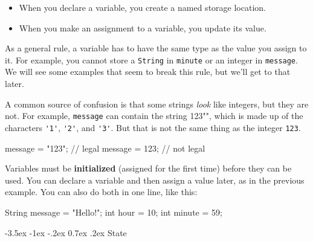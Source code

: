 \documentclass[12pt]{book}
\makeatletter
\theoremstyle{exercise}
\newcommand{\java}[1]{\verb"#1"}
\renewcommand{\section}{\@startsection{section}{1}{\z@}%
    {-3.5ex \@plus -1ex \@minus -.2ex}%
    {0.7ex \@plus.2ex}%
    {\normalfont\Large\bfseries}}
\newcommand{\java}[1]{\lstinline{#1}} %
\makeatother
\begin{document}
\begin{itemize}
\item When you declare a variable, you create a named storage location.
\item When you make an assignment to a variable, you update its value.
\end{itemize}

As a general rule, a variable has to have the same type as the value you assign to it.
For example, you cannot store a \java{String} in \java{minute} or an integer in \java{message}.
We will see some examples that seem to break this rule, but we'll get to that later.


A common source of confusion is that some strings {\em look} like integers, but they are not.
For example, \java{message} can contain the string \java{"123"}, which is made up of the characters \java{'1'}, \java{'2'}, and \java{'3'}.
But that is not the same thing as the integer \java{123}.

\begin{code}
    message = "123";    // legal
    message = 123;      // not legal
\end{code}


Variables must be {\bf initialized} (assigned for the first time) before they can be used.
You can declare a variable and then assign a value later, as in the previous example.
You can also do both in one line, like this:

\begin{code}
    String message = "Hello!";
    int hour = 10;
    int minute = 59;
\end{code}

%
%


\section{State}
\label{state}
\end{document}
